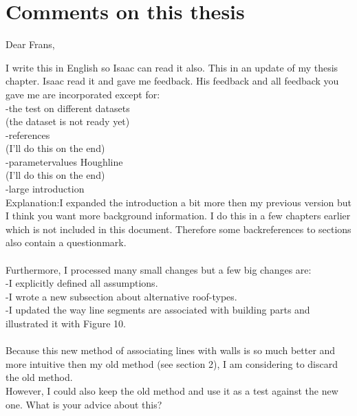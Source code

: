 \section{Comments on this thesis}
Dear Frans,

I write this in English so Isaac can read it also.
This in an update of my thesis chapter. Isaac read it and gave me feedback. His feedback and all feedback you gave me are incorporated except for:\\
-the test on different datasets\\
(the dataset is not ready yet)\\
-references\\
(I'll do this on the end)\\
-parametervalues Houghline\\
(I'll do this on the end)\\
-large introduction\\
Explanation:I expanded the introduction a bit more then my previous version but I think you
want more background information. I do this in a few chapters earlier which is
not included in this document. Therefore some backreferences to sections also
contain a questionmark.\\
\\
Furthermore, I processed many small changes but a few big changes are:\\
-I explicitly defined all assumptions.\\
-I wrote a new subsection about alternative roof-types.\\
-I updated the way line segments are associated with building parts and illustrated it with Figure 10.\\
\\
Because this new method of associating lines with walls is so much better and
more intuitive then my old method (see section 2), I am considering to
discard the old method.\\ 
However, I could also keep the old method and use it as
a test against the new one. What is your advice about this?\\


